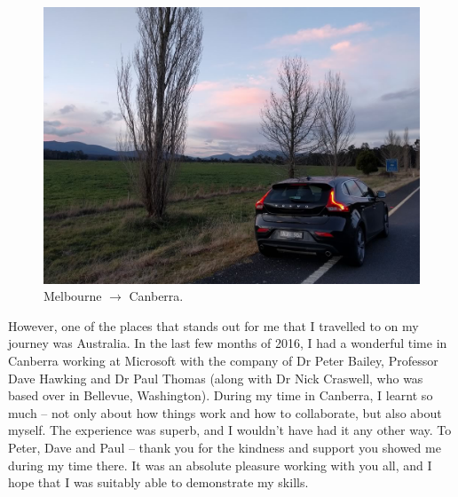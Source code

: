 \begin{preamble}
\renewcommand{\figurename}{Picture}
\begin{figure}
    \begin{center}
    \vspace*{-9mm}
    \includegraphics[width=1\textwidth]{figures/ch0-aus.jpg}
    \end{center}
    \vspace*{-6mm}
    \caption{Melbourne $\rightarrow$ Canberra.}
    \label{fig:acks_australia}
\end{figure}
\renewcommand{\figurename}{Figure}

However, one of the places that stands out for me that I travelled to on my journey was Australia. In the last few months of 2016, I had a wonderful time in Canberra working at Microsoft with the company of Dr Peter Bailey, Professor Dave Hawking and Dr Paul Thomas (along with Dr Nick Craswell, who was based over in Bellevue, Washington). During my time in Canberra, I learnt so much -- not only about how things work and how to collaborate, but also about myself. The experience was superb, and I wouldn't have had it any other way. To Peter, Dave and Paul -- thank you for the kindness and support you showed me during my time there. It was an absolute pleasure working with you all, and I hope that I was suitably able to demonstrate my skills.


\end{preamble}

